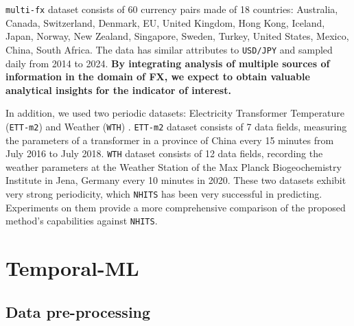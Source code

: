 \verb|multi-fx| dataset consists of 60 currency pairs made of 18 countries: Australia, Canada, Switzerland, Denmark, EU, United Kingdom, Hong Kong, Iceland, Japan, Norway, New Zealand, Singapore, Sweden, Turkey, United States, Mexico, China, South Africa. The data has similar attributes to \verb|USD/JPY| and sampled daily from 2014 to 2024. \textbf{By integrating analysis of multiple sources of information in the domain of FX, we expect to obtain valuable analytical insights for the indicator of interest.}


In addition, we used two periodic datasets: Electricity Transformer Temperature (\verb|ETT-m2|) \cite{zhou2021informer} and Weather (\verb|WTH|) \cite{Kolle}. \verb|ETT-m2| dataset consists of 7 data fields, measuring the parameters of a transformer in a province of China every 15 minutes from July 2016 to July 2018. \verb|WTH| dataset consists of 12 data fields, recording the weather parameters at the Weather Station of the Max Planck Biogeochemistry Institute in Jena, Germany every 10 minutes in 2020. These two datasets exhibit very strong periodicity, which \verb|NHITS| has been very successful in predicting. Experiments on them provide a more comprehensive comparison of the proposed method's capabilities against \verb|NHITS|.


\section{Temporal-ML}

\subsection{Data pre-processing}
\label{subsec:ml_preprocess}

